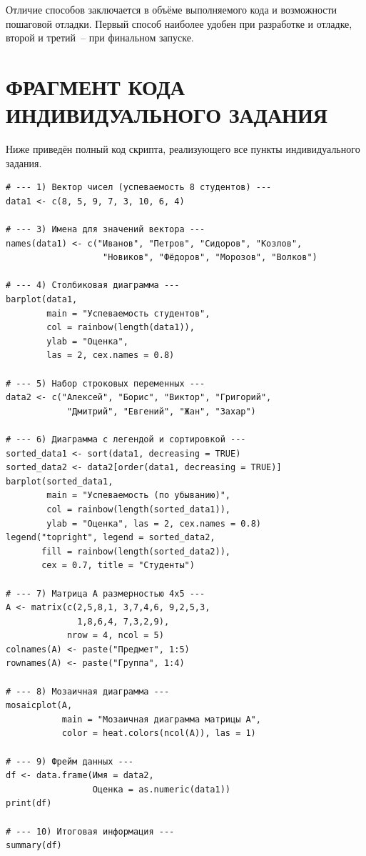 \documentclass[14pt,a4paper]{extarticle}
\begin{document}
Отличие способов заключается в объёме выполняемого кода и возможности пошаговой отладки. Первый способ наиболее удобен при разработке и отладке, второй и третий~-- при финальном запуске.

\newpage

\section{ФРАГМЕНТ КОДА ИНДИВИДУАЛЬНОГО ЗАДАНИЯ}

Ниже приведён полный код скрипта, реализующего все пункты индивидуального задания.

\begin{lstlisting}[caption={Скрипт lab1\_script.R}, label=lst:lab1]
# --- 1) Вектор чисел (успеваемость 8 студентов) ---
data1 <- c(8, 5, 9, 7, 3, 10, 6, 4)

# --- 3) Имена для значений вектора ---
names(data1) <- c("Иванов", "Петров", "Сидоров", "Козлов",
                   "Новиков", "Фёдоров", "Морозов", "Волков")

# --- 4) Столбиковая диаграмма ---
barplot(data1,
        main = "Успеваемость студентов",
        col = rainbow(length(data1)),
        ylab = "Оценка",
        las = 2, cex.names = 0.8)

# --- 5) Набор строковых переменных ---
data2 <- c("Алексей", "Борис", "Виктор", "Григорий",
            "Дмитрий", "Евгений", "Жан", "Захар")

# --- 6) Диаграмма с легендой и сортировкой ---
sorted_data1 <- sort(data1, decreasing = TRUE)
sorted_data2 <- data2[order(data1, decreasing = TRUE)]
barplot(sorted_data1,
        main = "Успеваемость (по убыванию)",
        col = rainbow(length(sorted_data1)),
        ylab = "Оценка", las = 2, cex.names = 0.8)
legend("topright", legend = sorted_data2,
       fill = rainbow(length(sorted_data2)),
       cex = 0.7, title = "Студенты")

# --- 7) Матрица A размерностью 4x5 ---
A <- matrix(c(2,5,8,1, 3,7,4,6, 9,2,5,3,
              1,8,6,4, 7,3,2,9),
            nrow = 4, ncol = 5)
colnames(A) <- paste("Предмет", 1:5)
rownames(A) <- paste("Группа", 1:4)

# --- 8) Мозаичная диаграмма ---
mosaicplot(A,
           main = "Мозаичная диаграмма матрицы A",
           color = heat.colors(ncol(A)), las = 1)

# --- 9) Фрейм данных ---
df <- data.frame(Имя = data2,
                 Оценка = as.numeric(data1))
print(df)

# --- 10) Итоговая информация ---
summary(df)
\end{lstlisting}
\end{document}
